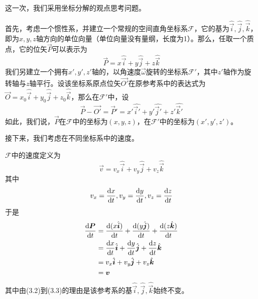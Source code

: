 \newcommand{\base}[1]{\hat{\vec{#1}}}
\begin{prove}
	这一次，我们采用坐标分解的观点思考问题。
	
	首先，考虑一个惯性系，并建立一个常规的空间直角坐标系$\mathcal{F}$，它的基为$\hat{\vec{i}},\hat{\vec{j}},\hat{\vec{k}}$，即为$x,y,z$轴方向的单位向量（单位向量没有量纲，长度为1）。那么，任取一个质点，它的位矢$\vec{P}$可以表示为\[
	\vec{P}=x\hat{\vec{i}}+y\hat{\vec{j}}+z\hat{\vec{k}}
	\]
	我们另建立一个拥有$x',y',z'$轴的，以角速度$\vec{\omega}$旋转的坐标系$\mathcal{F}'$，其中$z'$轴作为旋转轴与$z$轴平行。设该坐标系原点位矢$\vec{O'}$在原参考系中的表达式为$\vec{O}=x_0\hat{\vec{i}}+y_0\hat{\vec{j}}+z_0\hat{\vec{k}}$，那么在$\mathcal{F}'$中，设
	\[\vec{P}-\vec{O'}=\vec{P}'=x'\hat{\vec{i}'}+y'\hat{\vec{j}'}+z'\hat{\vec{k}'}\]
	如此，我们说，$\vec{P}$在$\mathcal{F}$中的坐标为$(x,y,z)$，在$\mathcal{F}'$中的坐标为$(x',y',z')$。
	
	接下来，我们考虑在不同坐标系中的速度。
	
	$\mathcal{F}$中的速度定义为\[\vec{v}=v_x\base{i}+v_y\base{j}+v_z\base{k}\]其中
	\[v_x=\dfrac{\dif x}{\dif t},v_y=\dfrac{\dif y}{\dif t},v_z=\dfrac{\dif z}{\dif t}\]
	于是
	\begin{align}
		\dfrac{\dif\vec{P}}{\dif t}&=\dfrac{\dif(x\hat{\vec{i}})}{\dif t}+\dfrac{\dif(y\hat{\vec{j}})}{\dif t}+\dfrac{\dif(z\hat{\vec{k}})}{\dif t}\\
		&=\dfrac{\dif x}{\dif t}\hat{\vec{i}}+\dfrac{\dif y}{\dif t}\hat{\vec{j}}+\dfrac{\dif z}{\dif t}\hat{\vec{k}}\\
		&=v_x\hat{\vec{i}}+v_y\hat{\vec{j}}+v_z\hat{\vec{k}}\\
		&=\vec{v}
	\end{align}
	其中由(3.2)到(3.3)的理由是该参考系的基$\hat{\vec{i}},\hat{\vec{j}},\hat{\vec{k}}$始终不变。
	

\end{prove}
